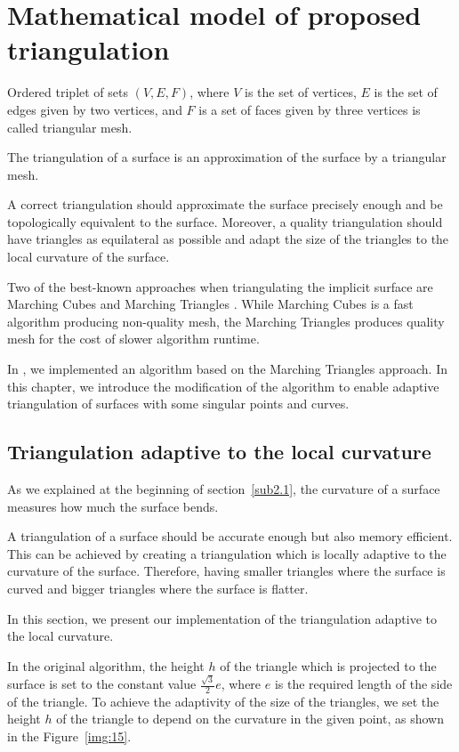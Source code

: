 \chapter{Mathematical model of proposed triangulation}
\label{chap2}

Ordered triplet of sets $(V, E, F)$, where $V$ is the set of vertices, $E$ is the set of edges given
by two vertices, and $F$ is a set of faces given by three vertices is called triangular
mesh.

The triangulation of a surface is an approximation of the surface by a triangular mesh.

A correct triangulation should approximate the surface precisely enough and
be topologically equivalent to the surface. Moreover, a quality triangulation
should have triangles as equilateral as possible and adapt the size of the triangles
to the local curvature of the surface.

Two of the best-known approaches when triangulating the implicit surface are
Marching Cubes \cite{lorensen1987marching} and Marching Triangles \cite{hilton1996marching}.
While Marching Cubes is a fast algorithm producing non-quality mesh, the Marching Triangles
produces quality mesh for the cost of slower algorithm runtime.

In \cite{korecova2021triangulation}, we implemented an algorithm based on the Marching
Triangles approach. In this chapter, we introduce the modification of the algorithm 
to enable adaptive triangulation of surfaces with some singular points and curves. 

\section{Triangulation adaptive to the local curvature}
\label{sub3.1}

As we explained at the beginning of section~\ref{sub2.1}, the curvature of a surface
measures how much the surface bends.

A triangulation of a surface should be accurate enough but also memory efficient.
This can be achieved by creating a triangulation which is locally adaptive to the
curvature of the surface. Therefore, having smaller triangles where
the surface is curved and bigger triangles where the surface is flatter.

In this section, we present our implementation of the triangulation adaptive
to the local curvature.

In the original algorithm, the height $h$ of the triangle which is projected
to the surface is set to the constant value $\frac{\sqrt{3}}{2}e$, where $e$ 
is the required length of the side of the triangle. To achieve the adaptivity
of the size of the triangles, we set the height $h$ of the triangle to depend
on the curvature in
the given point, as shown in the Figure~\ref{img:15}.

